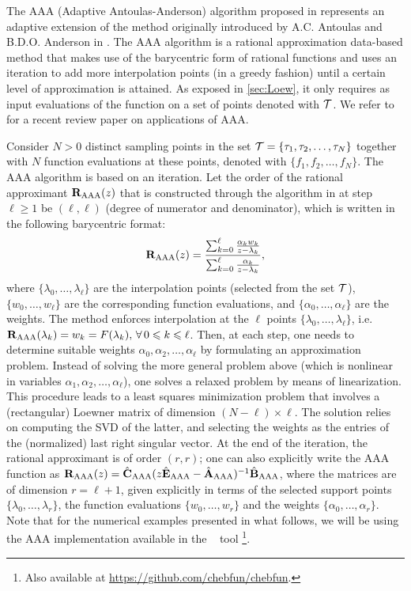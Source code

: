 The AAA (Adaptive Antoulas-Anderson) algorithm proposed in \cite{nst18} represents an adaptive extension of the method originally introduced by A.C. Antoulas and B.D.O. Anderson in \cite{aa86}. The AAA algorithm is a rational approximation data-based method that makes use of the barycentric form of rational functions and uses an iteration to add more interpolation points (in a greedy fashion) until a certain level of approximation is attained. As exposed in \cref{sec:Loew}, it only requires as input evaluations of the function on a set of points denoted with ${\cal T}$. We refer to \cite{AAAreview} for a recent review paper on applications of AAA.


Consider $N>0$ distinct sampling points in the set ${\cal T} = \{\tau_1, \tau_2, \ldots,\tau_N\}$ together with $N$ function evaluations at these points, denoted with $\{f_1, f_2, \ldots,f_N\}$.
The AAA algorithm is based on an iteration. 
Let the order of the rational approximant ${\mathbf R}_{{\mathrm{AAA}}}(z)$ that is constructed through the algorithm in \cite{nst18} at step $\ell \geq 1$ be $(\ell,\ell)$ (degree of numerator and denominator), which is written in the following barycentric format: 
\begin{equation}\label{eq:AAA_approx}
{\mathbf R}_{{\mathrm{AAA}}}(z) = \frac{ \sum_{k=0}^\ell \frac{ \alpha_k w_k }{z - \lambda_k }}{ \sum_{k=0}^\ell \frac{\alpha_k }{z- \lambda_k}},
\end{equation}
where $\{\lambda_0,\ldots,\lambda_\ell\}$ are the interpolation points (selected from the set ${\cal T}$), $\{w_0,\ldots,w_\ell\}$ are the corresponding function evaluations, and $\{\alpha_0,\ldots,\alpha_\ell\}$ are the weights. The method enforces interpolation at the $\ell$ points $\{\lambda_0,\ldots,\lambda_\ell\}$, i.e. ${\mathbf R}_{{\mathrm{AAA}}}(\lambda_k) = w_k = F(\lambda_k), \, \forall \, 0 \leqslant k \leqslant \ell$. Then, at each step, one needs to determine suitable weights $\alpha_0,\alpha_2,\ldots,\alpha_\ell$ by formulating an approximation problem. Instead of solving the more general problem above (which is nonlinear in variables $\alpha_1, \alpha_2, \ldots, \alpha_\ell$), one solves a relaxed problem by means of linearization. This procedure leads to a least squares minimization problem that involves a (rectangular) Loewner matrix of dimension $(N-\ell) \times \ell$. The solution relies on computing the SVD of the latter, and selecting the weights as the entries of the (normalized) last right singular vector.
At the end of the iteration, the rational approximant is of order $(r,r)$; one can also explicitly write the AAA function as ${\mathbf R}_{{\mathrm{AAA}}}(z) = \hat{{\mathbf C}}_{\mathrm{AAA}} (z \hat{{\mathbf E}}_{\mathrm{AAA}}-\hat{{\mathbf A}}_{\mathrm{AAA}})^{-1} \hat{{\mathbf B}}_{\mathrm{AAA}}$,
where the matrices are of dimension $r=\ell+1$, given explicitly in terms of the selected support points  $\{\lambda_0,\ldots,\lambda_r\}$, the function evaluations $\{w_0,\ldots,w_r\}$ and the weights $\{\alpha_0,\ldots,\alpha_r\}$. Note that for the numerical examples presented in what follows, we will be using the AAA implementation available in the \chebfun~ tool \cite{chebfun}\footnote{Also available at \url{https://github.com/chebfun/chebfun}.}.


